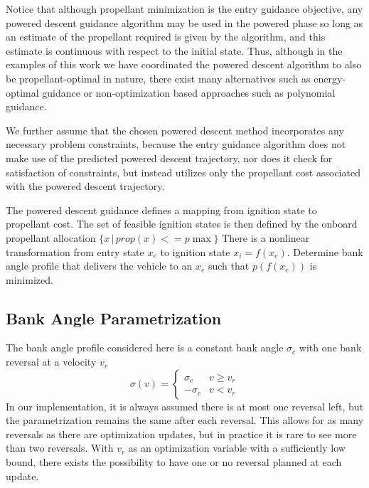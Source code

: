 \documentclass[letterpaper, preprint, paper,11pt]{AAS}
\begin{document}
Notice that although propellant minimization is the entry guidance objective, any powered descent guidance algorithm may be used in the powered phase so long as an estimate of the propellant required is given by the algorithm, and this estimate is continuous with respect to the initial state. Thus, although in the examples of this work we have coordinated the powered descent algorithm to also be propellant-optimal in nature, there exist many alternatives such as energy-optimal guidance or non-optimization based approaches such as polynomial guidance. 


We further assume that the chosen powered descent method incorporates any necessary problem constraints, because the entry guidance algorithm does not make use of the predicted powered descent trajectory, nor does it check for satisfaction of constraints, but instead utilizes only the propellant cost associated with the powered descent trajectory. 

The powered descent guidance defines a mapping from ignition state to propellant cost. 
The set of feasible ignition states is then defined by the onboard propellant allocation $\{x\, |\, prop(x) <= p{\max}\} $
There is a nonlinear transformation from entry state $x_e$ to ignition state $x_i = f(x_e)$. Determine bank angle profile that delivers the vehicle to an $x_e$ such that $p(f(x_e))$ is minimized. 

\subsection{Bank Angle Parametrization}

The bank angle profile considered here is a constant bank angle $\sigma_c$ with one bank reversal at a velocity $v_r$
\begin{equation}
\sigma(v) = \left\{
\begin{array}{ll}
\sigma_c & v\geq v_r \\
-\sigma_c & v < v_r
\end{array} 
\right.
\end{equation}
In our implementation, it is always assumed there is at most one reversal left, but the parametrization remains the same after each reversal. This allows for as many reversals as there are optimization updates, but in practice it is rare to see more than two reversals. With $v_r$ as an optimization variable with a sufficiently low bound, there exists the possibility to have one or no reversal planned at each update.  
\end{document}
